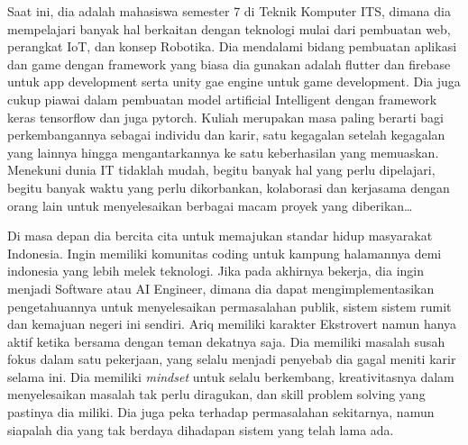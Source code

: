 Saat ini, dia adalah mahasiswa semester 7 di Teknik Komputer ITS, dimana dia mempelajari banyak hal berkaitan dengan teknologi mulai dari pembuatan web, perangkat IoT, dan konsep Robotika. Dia mendalami bidang pembuatan aplikasi dan game dengan framework yang biasa dia gunakan adalah flutter dan firebase untuk app development serta unity gae engine untuk game development. Dia juga cukup piawai dalam pembuatan model artificial Intelligent dengan framework keras tensorflow dan juga pytorch. Kuliah merupakan masa paling berarti bagi perkembangannya sebagai individu dan karir, satu kegagalan setelah kegagalan yang lainnya hingga mengantarkannya ke satu keberhasilan yang memuaskan. Menekuni dunia IT tidaklah mudah, begitu banyak hal yang perlu dipelajari, begitu banyak waktu yang perlu dikorbankan, kolaborasi dan kerjasama dengan orang lain untuk menyelesaikan berbagai macam proyek yang diberikan\dots

Di masa depan dia bercita cita untuk memajukan standar hidup masyarakat Indonesia. Ingin memiliki komunitas coding untuk kampung halamannya demi indonesia yang lebih melek teknologi. Jika pada akhirnya bekerja, dia ingin menjadi Software atau AI Engineer, dimana dia dapat mengimplementasikan pengetahuannya untuk menyelesaikan permasalahan publik, sistem sistem rumit dan kemajuan negeri ini sendiri. Ariq memiliki karakter Ekstrovert namun hanya aktif ketika bersama dengan teman dekatnya saja. Dia memiliki masalah susah fokus dalam satu pekerjaan, yang selalu menjadi penyebab dia gagal meniti karir selama ini. Dia memiliki \emph{mindset} untuk selalu berkembang, kreativitasnya dalam menyelesaikan masalah tak perlu diragukan, dan skill problem solving yang pastinya dia miliki. Dia juga peka terhadap permasalahan sekitarnya, namun siapalah dia yang tak berdaya dihadapan sistem yang telah lama ada.
